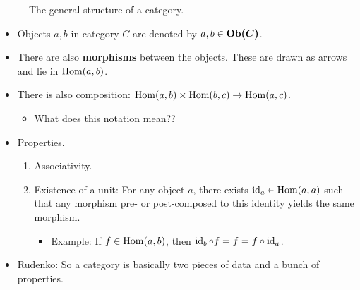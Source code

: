 \documentclass[../notes.tex]{subfiles}
\begin{document}
\begin{itemize}
\begin{figure}[h!]
        \caption{The general structure of a category.}
        \label{fig:category}
    \end{figure}
    \begin{itemize}
        \item Objects $a,b$ in category $C$ are denoted by $a,b\in\bm{\Ob(C)}$.
        \item There are also \textbf{morphisms} between the objects. These are drawn as arrows and lie in $\operatorname{Hom}(a,b)$.
        \item There is also composition: $\operatorname{Hom}(a,b)\times\operatorname{Hom}(b,c)\to\operatorname{Hom}(a,c)$.
        \begin{itemize}
            \item What does this notation mean??
        \end{itemize}
        \item Properties.
        \begin{enumerate}
            \item Associativity.
            \item Existence of a unit: For any object $a$, there exists $\operatorname{id}_a\in\operatorname{Hom}(a,a)$ such that any morphism pre- or post-composed to this identity yields the same morphism.
            \begin{itemize}
                \item Example: If $f\in\operatorname{Hom}(a,b)$, then $\operatorname{id}_b\circ f=f=f\circ\operatorname{id}_a$.
            \end{itemize}
        \end{enumerate}
        \item Rudenko: So a category is basically two pieces of data and a bunch of properties.

\end{itemize}
\end{itemize}
\end{document}
